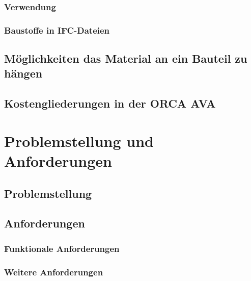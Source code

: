 \subsubsection{Verwendung}
\subsubsection{Baustoffe in IFC-Dateien}
\subsection{Möglichkeiten das Material an ein Bauteil zu hängen}
\subsection{Kostengliederungen in der ORCA AVA}

\section{Problemstellung und Anforderungen}
\subsection{Problemstellung}
\subsection{Anforderungen}
\subsubsection{Funktionale Anforderungen}
\subsubsection{Weitere Anforderungen}
